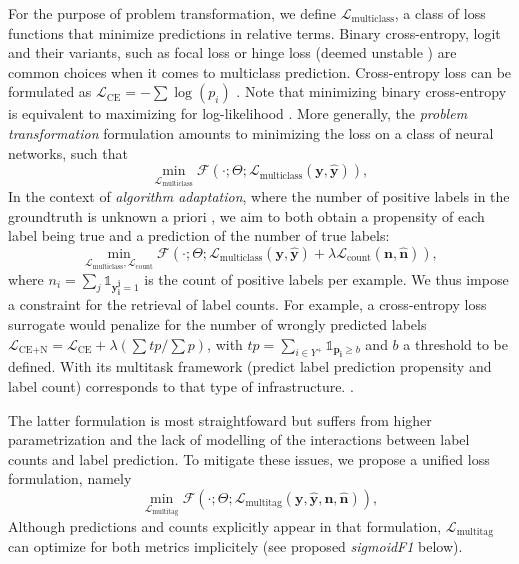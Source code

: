 For the purpose of problem transformation, we define \(\mathcal{L}_{\text {multiclass}}\), a class of loss functions that minimize predictions in relative terms. Binary cross-entropy, logit and their variants, such as focal loss or hinge loss (deemed unstable \cite{focalLoss} ) are common choices when it comes to multiclass prediction. Cross-entropy loss can be formulated as \(\mathcal{L}_{\text {CE}}=-\sum \log \left(p_{i}\right)\) . Note that minimizing binary cross-entropy is equivalent to maximizing for log-likelihood \cite[Section 4.3.4]{Bishop}. More generally, the \emph{problem transformation} formulation amounts to minimizing the loss on a class of neural networks, such that
%
\begin{equation}
\underset{\mathcal{L}_{\text {multiclass}}} {\min} \mathcal{F}\left(\cdot ; \Theta; \mathcal{L}_{\text {multiclass}} (\mathbf{y}, \hat{\mathbf{y}}) \right),
\end{equation}
%
In the context of \emph{algorithm adaptation}, where the number of positive labels in the groundtruth is unknown a priori , we aim to both obtain a propensity of each label being true and a prediction of the number of true labels: 
%
\begin{equation}
\underset{\mathcal{L}_{\text {multiclass}}, \mathcal{L}_{\text {count}}} {\min} \mathcal{F}\left(\cdot ; \Theta; \mathcal{L}_{\text {multiclass}} (\mathbf{y}, \hat{\mathbf{y}}) + \lambda \mathcal{L}_{\text {count}} (\mathbf{n}, \hat{\mathbf{n}})\right),
\end{equation}
%
where \(n_i = \sum_j \mathds{1}_{\mathbf{y_i^j} = 1}\) is the count of positive labels per example. We thus impose a constraint for the retrieval of label counts. For example, a cross-entropy loss surrogate  would penalize for the number of wrongly predicted labels \(\mathcal{L}_{\text {CE+N}}= \mathcal{L}_{\text {CE}} + \lambda (\sum tp / \sum p)\), with \(t p=\sum_{i \in Y^{+}} \mathds{1}_{\mathbf{p_i} \geq b}\) and \(b\) a threshold to be defined. With its multitask framework (predict label prediction propensity and label count) \cite{multitaskLabel} corresponds to that type of infrastructure. .

The latter formulation is most straightfoward but suffers from higher parametrization and the lack of modelling of the interactions between label counts and label prediction. To mitigate these issues, we propose a unified loss formulation, namely
%
\begin{equation}
\underset{\mathcal{L}_{\text {multitag}}} {\min} \mathcal{F}\left(\cdot ; \Theta; \mathcal{L}_{\text {multitag}} (\mathbf{y}, \hat{\mathbf{y}}, \mathbf{n}, \hat{\mathbf{n}}) \right),
\end{equation}
%
Although predictions and counts explicitly appear in that formulation, \(\mathcal{L}_{\text {multitag}}\) can optimize for both metrics implicitely (see proposed \emph{sigmoidF1} below).



